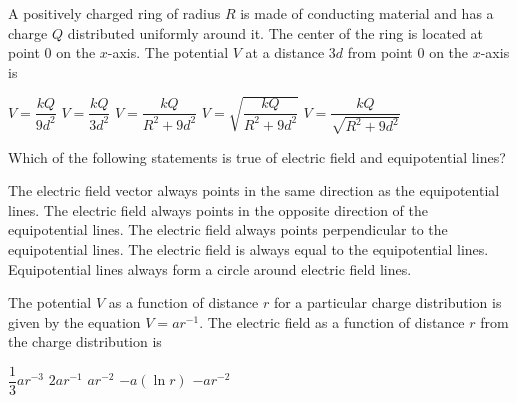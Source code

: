 \documentclass{../../../oss-apphys-exam}
\newcounter{last}
\begin{document}
\begin{questions}
  \question A positively charged ring of radius $R$ is made of conducting
  material and has a charge $Q$ distributed uniformly around it. The center of
  the ring is located at point $0$ on the $x$-axis. The potential $V$ at a
  distance $3d$ from point $0$ on the $x$-axis is
  \begin{center}
  \end{center}
  \begin{choices}
    \choice $V=\dfrac{kQ}{9d^2}$
    \choice $V=\dfrac{kQ}{3d^2}$
    \choice $V=\dfrac{kQ}{R^2+9d^2}$
    \choice $V=\sqrt{\dfrac{kQ}{R^2+9d^2}}$
    \choice $V=\dfrac{kQ}{\sqrt{R^2+9d^2}}$
  \end{choices}
    
  \question Which of the following statements is true of electric field and
  equipotential lines?
  \begin{choices}
    \choice The electric field vector always points in the same direction as
    the equipotential lines.
    \choice The electric field always points in the opposite direction of the
    equipotential lines.
    \choice The electric field always points perpendicular to the
    equipotential lines.
    \choice The electric field is always equal to the equipotential lines.
    \choice Equipotential lines always form a circle around electric field
    lines.
  \end{choices}
  \newpage
  
  \question The potential $V$ as a function of distance $r$ for a particular
  charge distribution is given by the equation $V=ar^{-1}$. The electric field
  as a function of distance $r$ from the charge distribution is
  \begin{choices}
    \choice $\dfrac13ar^{-3}$
    \choice $2ar^{-1}$
    \choice $ar^{-2}$
    \choice $-a(\ln r)$
    \choice $-ar^{-2}$
  \end{choices}
\end{questions}
\setcounter{last}{\value{question}}
\newpage

\end{document}

